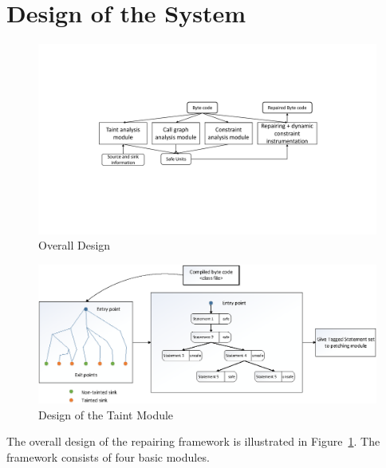 \section{Design of the System}
\label{sec:SystemDesign}


\begin{figure}[t]
\centering
\includegraphics[scale=.42]{images/OverallDesign.pdf}
\caption{Overall Design}
\label{fig:overallDesign}
\end{figure}


% 

\begin{figure}[t]
\centering
  \includegraphics[scale= .4]{images/TaintModule.png}
  \caption{Design of the Taint Module}
  \label{fig:TaintModule}
\end{figure}


The overall design of the repairing framework is illustrated in
Figure~\ref{fig:overallDesign}. The framework consists of four basic modules.


